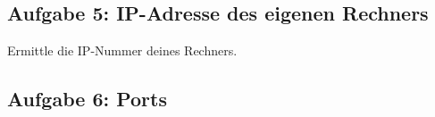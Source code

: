 % 
% 
% 
% 
% 
% 


\subsection{Aufgabe 5: IP-Adresse des eigenen Rechners}

Ermittle die IP-Nummer deines Rechners. 


\subsection{Aufgabe 6: Ports}

